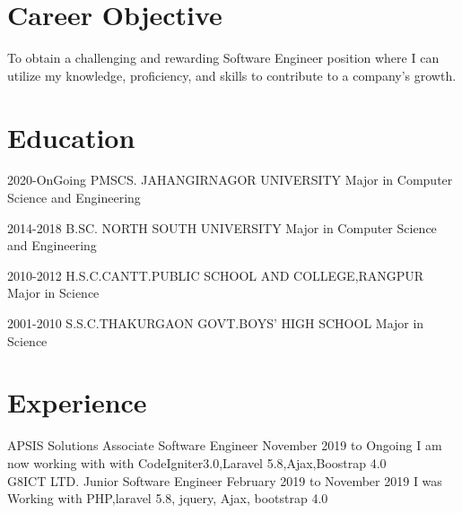 \documentclass[]{cv-style}
\begin{document}
\section{Career Objective}
To obtain a challenging and rewarding Software Engineer position where I can utilize my knowledge, proficiency, and skills to contribute to a company's growth.
\section{Education}
\begin{entrylist}
  \entry
    {2020-OnGoing \enspace}
    {PMSCS. JAHANGIRNAGOR UNIVERSITY}
    {Major in Computer Science and Engineering}

  \entry
    {2014-2018} 
    {B.SC. NORTH SOUTH UNIVERSITY}
    {Major in Computer Science and Engineering}
    
  \entry
    {2010-2012}
    {H.S.C.CANTT.PUBLIC SCHOOL AND COLLEGE,RANGPUR}
    {Major in Science}
    
  \entry
    {2001-2010}
    {S.S.C.THAKURGAON GOVT.BOYS' HIGH SCHOOL}
    {Major in Science}
    
 
\end{entrylist}
\section{Experience}
\begin{entrylist}
 \entry
  {APSIS Solutions \enspace}
   {Associate Software Engineer}
  {November 2019 to Ongoing}
    {I am now working with with CodeIgniter3.0,Laravel 5.8,Ajax,Boostrap 4.0}
    \\
\entry
  {G8ICT LTD.}
  {Junior Software Engineer}
  {February 2019 to November 2019}
 { I was  Working with PHP,laravel 5.8, jquery, Ajax, bootstrap 4.0}

\end{entrylist}

\end{document}
